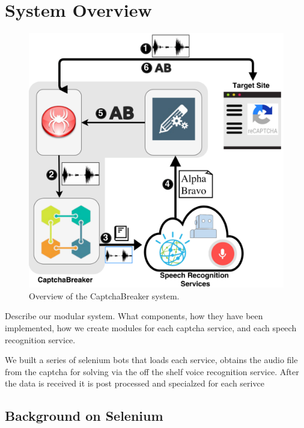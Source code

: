 \section{System Overview}
\label{sec:system}

\begin{figure}
\centering
\includegraphics[width=\columnwidth]{figures/breaker_arch.pdf}
\caption{Overview of the CaptchaBreaker system.}
\label{fig:breaker}
\end{figure}

Describe our modular system. What components, how they have been implemented, how we create modules for each captcha service, and each speech recognition service.


We built a series of selenium bots that loads each service, obtains the audio file from the captcha for solving via the off the shelf voice recognition service. After the data is received it is post processed and specialzed for each serivce 


\subsection{Background on Selenium} 

